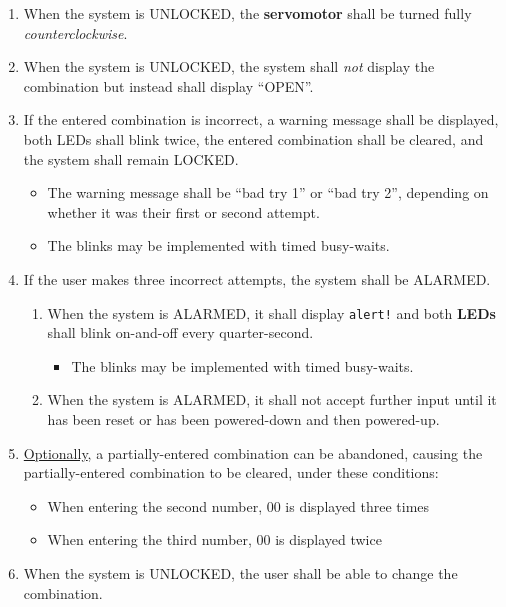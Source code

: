 \begin{enumerate}[start=\value{enumi}]
    \item When the system is UNLOCKED, the \textbf{servomotor} shall be turned fully \textit{counterclockwise}.
    \item When the system is UNLOCKED, the system shall \textit{not} display the combination but instead shall display ``OPEN''.
    \item \label{spec:incorrectCombination} If the entered combination is incorrect, a warning message shall be displayed, both LEDs shall blink twice, the entered combination shall be cleared, and the system shall remain LOCKED\@.
        \begin{itemize}
            \item The warning message shall be ``bad try 1'' or ``bad try 2'', depending on whether it was their first or second attempt.
            \item The blinks may be implemented with timed busy-waits.
        \end{itemize}
    \item If the user makes three incorrect attempts, the system shall be ALARMED\@.
        \begin{enumerate}
            \item When the system is ALARMED, it shall display \texttt{alert!} and both \textbf{LEDs} shall blink on-and-off every quarter-second.
                \begin{itemize}
                    \item The blinks may be implemented with timed busy-waits.
                \end{itemize}
            \item When the system is ALARMED, it shall not accept further input until it has been reset or has been powered-down and then powered-up.
        \end{enumerate}
    \item \label{spec:abandonedCombination} \underline{Optionally}, a partially-entered combination can be abandoned, causing the partially-entered combination to be cleared, under these conditions:
        \begin{itemize}
            \item When entering the second number, 00 is displayed three times
            \item When entering the third number, 00 is displayed twice
        \end{itemize}
    \item \label{spec:changeCombination} When the system is UNLOCKED, the user shall be able to change the combination.

\end{enumerate}
